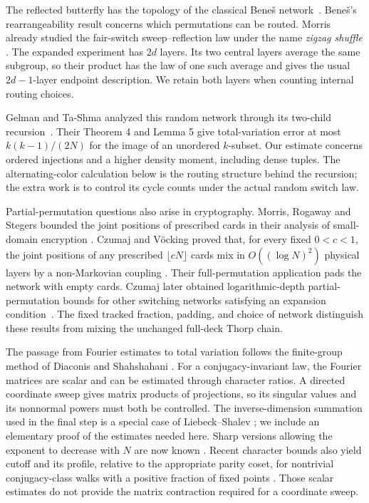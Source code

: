 The reflected butterfly has the topology of the classical Bene\v{s}
network~\cite{Benes1964}. Bene\v{s}'s rearrangeability result concerns
which permutations can be routed. Morris already studied the
fair-switch sweep--reflection law under the name \emph{zigzag shuffle}
\cite[Section 4]{Morris2008}. The expanded experiment has $2d$ layers.
Its two central layers average the same subgroup, so their product has
the law of one such average and gives the usual $2d-1$-layer endpoint
description. We retain both layers when counting internal routing
choices.

Gelman and Ta-Shma analyzed this random network through its two-child
recursion~\cite[Section 4, Proposition 1]{GelmanTaShma2014}. Their
Theorem 4 and Lemma 5 give total-variation error at most $k(k-1)/(2N)$
for the image of an unordered $k$-subset. Our estimate concerns ordered
injections and a higher density moment, including dense tuples. The
alternating-color calculation below is the routing structure behind
the recursion; the extra work is to control its cycle counts under
the actual random switch law.

Partial-permutation questions also arise in cryptography. Morris,
Rogaway and Stegers bounded the joint positions of prescribed cards in
their analysis of small-domain encryption
\cite{mrs,MorrisRogawayStegers2018}. Czumaj and V\"ocking proved that,
for every fixed $0<c<1$, the joint positions of any prescribed
$\lfloor cN\rfloor$ cards mix in
$O((\log N)^2)$ physical layers by a non-Markovian coupling
\cite{CzumajVocking2014}. Their full-permutation application pads the
network with empty cards. Czumaj later obtained logarithmic-depth
partial-permutation bounds for other switching networks satisfying an
expansion condition~\cite[Theorems 3.4--3.6]{Czumaj2015}.
The fixed tracked fraction, padding, and choice of network distinguish
these results from mixing the unchanged full-deck Thorp chain.

The passage from Fourier estimates to total variation follows the
finite-group method of Diaconis and Shahshahani
\cite{DiaconisShahshahani1981}. For a conjugacy-invariant law, the
Fourier matrices are scalar and can be estimated through character
ratios. A directed coordinate sweep gives matrix products of
projections, so its singular values and its nonnormal powers must both
be controlled. The inverse-dimension summation used in the final step
is a special case of Liebeck--Shalev
\cite[Proposition 2.5 and Theorem 2.6]{liebeck-shalev2004}; we include an
elementary proof of the estimates needed here. Sharp versions allowing
the exponent to decrease with $N$ are now known
\cite[Proposition 1.8]{teyssier-thevenin2025}. Recent character bounds
also yield cutoff and its profile, relative to the appropriate parity
coset, for nontrivial conjugacy-class walks with a positive fraction of
fixed points
\cite{olesker-taylor-teyssier-thevenin2025,Teyssier2026}.
Those scalar estimates do not provide the matrix contraction required
for a coordinate sweep.

